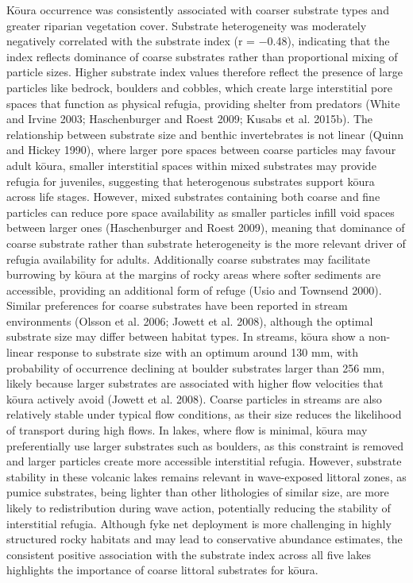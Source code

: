 \documentclass[
  12pt,
  a4paper,
]{scrbook}
\begin{document}
Kōura occurrence was consistently associated with coarser substrate
types and greater riparian vegetation cover. Substrate heterogeneity was
moderately negatively correlated with the substrate index (r = −0.48),
indicating that the index reflects dominance of coarse substrates rather
than proportional mixing of particle sizes. Higher substrate index
values therefore reflect the presence of large particles like bedrock,
boulders and cobbles, which create large interstitial pore spaces that
function as physical refugia, providing shelter from predators (White
and Irvine 2003; Haschenburger and Roest 2009; Kusabs et al. 2015b). The
relationship between substrate size and benthic invertebrates is not
linear (Quinn and Hickey 1990), where larger pore spaces between coarse
particles may favour adult kōura, smaller interstitial spaces within
mixed substrates may provide refugia for juveniles, suggesting that
heterogenous substrates support kōura across life stages. However, mixed
substrates containing both coarse and fine particles can reduce pore
space availability as smaller particles infill void spaces between
larger ones (Haschenburger and Roest 2009), meaning that dominance of
coarse substrate rather than substrate heterogeneity is the more
relevant driver of refugia availability for adults. Additionally coarse
substrates may facilitate burrowing by kōura at the margins of rocky
areas where softer sediments are accessible, providing an additional
form of refuge (Usio and Townsend 2000). Similar preferences for coarse
substrates have been reported in stream environments (Olsson et al.
2006; Jowett et al. 2008), although the optimal substrate size may
differ between habitat types. In streams, kōura show a non-linear
response to substrate size with an optimum around 130 mm, with
probability of occurrence declining at boulder substrates larger than
256 mm, likely because larger substrates are associated with higher flow
velocities that kōura actively avoid (Jowett et al. 2008). Coarse
particles in streams are also relatively stable under typical flow
conditions, as their size reduces the likelihood of transport during
high flows. In lakes, where flow is minimal, kōura may preferentially
use larger substrates such as boulders, as this constraint is removed
and larger particles create more accessible interstitial refugia.
However, substrate stability in these volcanic lakes remains relevant in
wave-exposed littoral zones, as pumice substrates, being lighter than
other lithologies of similar size, are more likely to redistribution
during wave action, potentially reducing the stability of interstitial
refugia. Although fyke net deployment is more challenging in highly
structured rocky habitats and may lead to conservative abundance
estimates, the consistent positive association with the substrate index
across all five lakes highlights the importance of coarse littoral
substrates for kōura.
\end{document}
